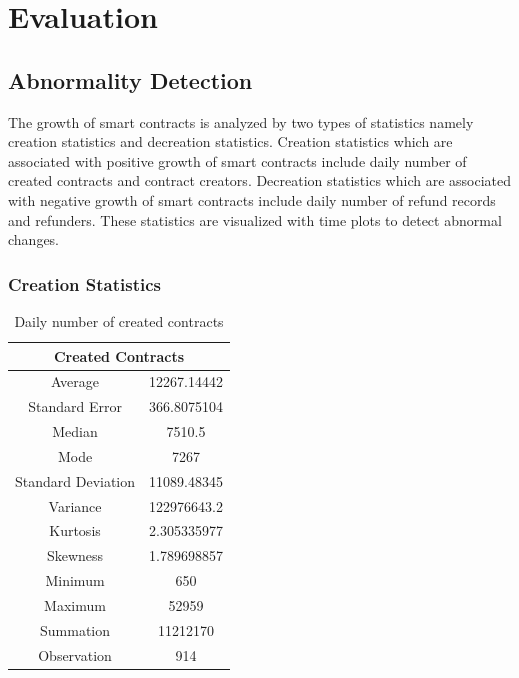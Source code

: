%
\chapter{Evaluation}
\label{sec:evaluation}



\section{Abnormality Detection}
\label{sec:evaluation:abnormality}

The growth of smart contracts is analyzed by two types of statistics namely creation statistics and decreation statistics. Creation statistics which are associated with positive growth of smart contracts include daily number of created contracts and contract creators. Decreation statistics which are associated with negative growth of smart contracts include daily number of refund records and refunders. These statistics are visualized with time plots to detect abnormal changes.

\subsection{Creation Statistics}
\label{sec:evaluation:abnormality:creation}

\begin{table}[h]
\caption{Daily number of created contracts}
\label{tab:created-contracts}
\renewcommand\arraystretch{0.7}
\begin{tabular}{@{}cc@{}}
\toprule
\multicolumn{2}{c}{Created Contracts} \\
\midrule
Average                & 12267.14442    \\
Standard Error         & 366.8075104    \\
Median                 & 7510.5         \\
Mode                   & 7267           \\
Standard Deviation     & 11089.48345    \\
Variance               & 122976643.2    \\
Kurtosis               & 2.305335977    \\
Skewness               & 1.789698857    \\
Minimum                & 650            \\
Maximum                & 52959          \\
Summation              & 11212170       \\
Observation            & 914            \\
\bottomrule
\end{tabular}
\end{table}

